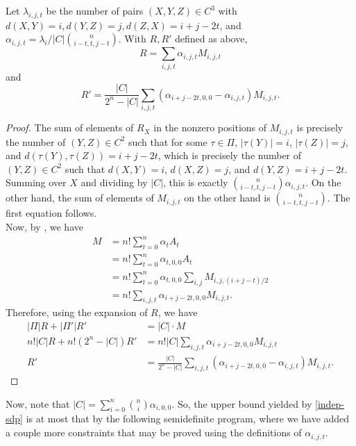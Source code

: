 	\begin{fprop}
		Let $\lambda_{i,j,t}$ be the number of pairs $(X,Y,Z) \in C^3$ with $d(X,Y) = i, d(Y,Z) = j, d(Z,X) = i+j-2t$, and $\alpha_{i,j,t} = \lambda_i / |C| \binom{n}{i-t,t,j-t}$.  With $R,R'$ defined as above,
		\[ R = \sum_{i,j,t} \alpha_{i,j,t} M_{i,j,t}  \]
		and
		\[ R' = \frac{|C|}{2^n - |C|} \sum_{i,j,t} (\alpha_{i+j-2t,0,0} - \alpha_{i,j,t}) M_{i,j,t}. \]
	\end{fprop}
	\begin{proof}
		The sum of elements of $R_X$ in the nonzero positions of $M_{i,j,t}$ is precisely the number of $(Y,Z) \in C^2$ such that for some $\tau \in \Pi$, $|\tau(Y)| = i$, $|\tau(Z)| = j$, and $d(\tau(Y),\tau(Z)) = i+j-2t$, which is precisely the number of $(Y,Z) \in C^2$ such that $d(X,Y) = i$, $d(X,Z) = j$, and $d(Y,Z) = i+j-2t$. Summing over $X$ and dividing by $|C|$, this is exactly $\binom{n}{i-t,t,j-t} \alpha_{i,j,t}$. On the other hand, the sum of elements of $M_{i,j,t}$ on the other hand is $\binom{n}{i-t,t,j-t}$. The first equation follows.\\
		Now, by , we have
		\begin{align*}
			M &= n! \sum_{t=0}^{n} \alpha_t A_t \\
				&= n! \sum_{t=0}^{n} \alpha_{t,0,0} A_t \\
				&= n! \sum_{t=0}^{n} \alpha_{t,0,0} \sum_{i,j} M_{i,j,(i+j-t)/2} \\
				&= n! \sum_{i,j,t} \alpha_{i+j-2t,0,0} M_{i,j,t}.
		\end{align*}
		Therefore, using the expansion of $R$, we have
		\begin{align*}
			|\Pi| R + |\Pi'| R' &= |C| \cdot M \\
			n! |C| R + n! (2^n - |C|) R' &= n! |C| \sum_{i,j,t} \alpha_{i+j-2t,0,0} M_{i,j,t} \\
			R' &= \frac{|C|}{2^n - |C|} \sum_{i,j,t} (\alpha_{i+j-2t,0,0} - \alpha_{i,j,t}) M_{i,j,t}.
		\end{align*}
	\end{proof}

	Now, note that $|C| = \sum_{i=0}^{n} \binom{n}{i} \alpha_{i,0,0}$. So, the upper bound yielded by \cref{indep-sdp} is at most that by the following semidefinite program, where we have added a couple more constraints that may be proved using the definitions of $\alpha_{i,j,t}$.

